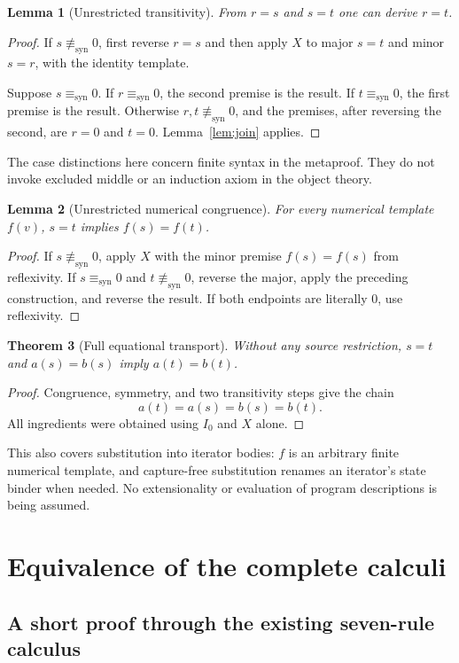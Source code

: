 \documentclass[11pt]{article}
\newtheorem{theorem}{Theorem}[section]
\newtheorem{lemma}[theorem]{Lemma}
\theoremstyle{definition}\newtheorem{definition}[theorem]{Definition}
\theoremstyle{remark}\newtheorem{remark}[theorem]{Remark}
\newcommand{\lit}{\equiv_{\mathrm{syn}}}
\newcommand{\nolit}{\not\equiv_{\mathrm{syn}}}
\begin{document}
\begin{lemma}[Unrestricted transitivity]\label{lem:trans}
From $r=s$ and $s=t$ one can derive $r=t$.
\end{lemma}
\begin{proof}
If $s\nolit0$, first reverse $r=s$ and then apply $X$ to major
$s=t$ and minor $s=r$, with the identity template.

Suppose $s\lit0$. If $r\lit0$, the second premise is the result.
If $t\lit0$, the first premise is the result. Otherwise $r,t\nolit0$,
and the premises, after reversing the second, are $r=0$ and $t=0$.
Lemma~\ref{lem:join} applies.
\end{proof}

The case distinctions here concern finite syntax in the metaproof.
They do not invoke excluded middle or an induction axiom in the object
theory.

\begin{lemma}[Unrestricted numerical congruence]\label{lem:congr}
For every numerical template $f(v)$, $s=t$ implies $f(s)=f(t)$.
\end{lemma}
\begin{proof}
If $s\nolit0$, apply $X$ with the minor premise
$f(s)=f(s)$ from reflexivity. If $s\lit0$ and $t\nolit0$, reverse
the major, apply the preceding construction, and reverse the result.
If both endpoints are literally $0$, use reflexivity.
\end{proof}

\begin{theorem}[Full equational transport]\label{thm:fulltr}
Without any source restriction, $s=t$ and $a(s)=b(s)$ imply
$a(t)=b(t)$.
\end{theorem}
\begin{proof}
Congruence, symmetry, and two transitivity steps give the chain
\[
       a(t)=a(s)=b(s)=b(t).
\]
All ingredients were obtained using $I_0$ and $X$ alone.
\end{proof}

This also covers substitution into iterator bodies: $f$ is an arbitrary
finite numerical template, and capture-free substitution renames an
iterator's state binder when needed. No extensionality or evaluation of
program descriptions is being assumed.

\section{Equivalence of the complete calculi}

\subsection{A short proof through the existing seven-rule calculus}
\end{document}
